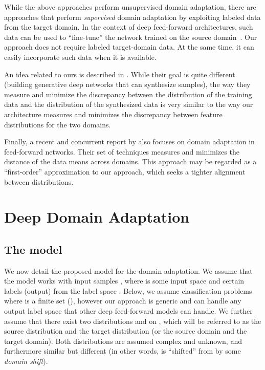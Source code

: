 \documentclass{article}
\begin{document}
While the above approaches perform unsupervised domain adaptation, there are approaches that perform {\em supervised} domain adaptation by exploiting labeled data from the target domain. In the context of deep feed-forward architectures, such data can be used to ``fine-tune'' the network trained on the source domain~\cite{Zeiler13,Oquab14,Babenko14}. Our approach does not require labeled target-domain data. At the same time, it can easily incorporate such data when it is available.

An idea related to ours is described in \cite{Goodfellow14}. While their goal is quite different (building generative deep networks that can synthesize samples), the way they measure and minimize the discrepancy between the distribution of the training data and the distribution of the synthesized data is very similar to the way our architecture measures and minimizes the discrepancy between feature distributions for the two domains.

Finally, a recent and concurrent report by \cite{Tzeng14} also focuses on domain adaptation in feed-forward networks. Their set of techniques measures and minimizes the distance of the data means across domains. This approach may be regarded as a ``first-order'' approximation to our approach, which seeks a tighter alignment between distributions. \section{Deep Domain Adaptation}

\def\x{{\mathbf x}}
\def\f{{\mathbf f}}

\def\S{{\cal S}}
\def\T{{\cal T}}

\def\R{{\mathds R}}

\def\tf{{\theta_f}}
\def\td{{\theta_d}}
\def\ty{{\theta_y}}
\def\htf{{\hat\theta_f}}
\def\htd{{\hat\theta_d}}
\def\hty{{\hat\theta_y}}

\subsection{The model}

We now detail the proposed model for the domain adaptation. We assume that the model works with input samples , where  is some input space and certain labels (output)  from the label space . Below, we assume classification problems where  is a finite set (), however our approach is generic and can handle any output label space that other deep feed-forward models can handle. We further assume that there exist two distributions  and  on , which will be referred to as the source distribution and the target distribution (or the source domain and the target domain). Both distributions are assumed complex and unknown, and furthermore similar but different (in other words,  is ``shifted'' from  by some {\em domain shift}). 
\end{document}
